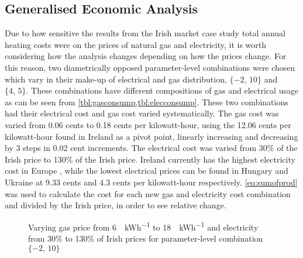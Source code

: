 \subsection{Generalised Economic Analysis}
Due to how sensitive the results from the Irish market case study total annual heating costs were on the prices of natural gas and electricity, it is worth considering how the analysis changes depending on how the prices change. For this reason, two diametrically opposed parameter-level combinations were chosen which vary in their make-up of electrical and gas distribution, $\{-2\text{, }10\}$ and $\{4\text{, }5\}$. These combinations have different compositions of gas and electrical usage as can be seen from \cref{tbl:gasconsump,tbl:elecconsump}. These two combinations had their electrical cost and gas cost varied systematically. The gas cost was varied from 0.06 cents to 0.18 cents per kilowatt-hour, using the 12.06 cents per kilowatt-hour found in Ireland as a pivot point, linearly increasing and decreasing by 3 steps in 0.02 cent increments. The electrical cost was varied from 30\% of the Irish price to 130\% of the Irish price. Ireland currently has the highest electricity cost in Europe \cite{household_energy_price_index_price_nodate}, while the lowest electrical prices can be found in Hungary and Ukraine at 9.33 cents and 4.3 cents per kilowatt-hour respectively. \cref{eq:sumofprod} was used to calculate the cost for each new gas and electricity cost combination and divided by the Irish price, in order to see relative change. 

\begin{figure}[htb]
    \centering
    \caption{Varying gas price from \qty{6}{\cents\per\kWh} to \qty{18}{\cents\per\kWh} and electricity from 30\% to 130\% of Irish prices for parameter-level combination $\{-2\text{, }10\}$}
    \label{fig:minus210cost}
\end{figure}

